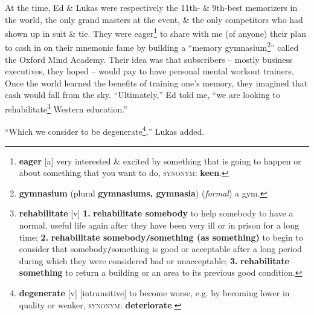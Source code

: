 \documentclass[oneside]{book}
\numberwithin{equation}{section}
\begin{document}
At the time, Ed \& Lukas were respectively the 11th- \& 9th-best memorizers in the world, the only grand masters at the event, \& the only competitors who had shown up in suit \& tie. They were eager\footnote{\textbf{eager} [a] very interested \& excited by something that is going to happen or about something that you want to do, \textsc{synonym}: \textbf{keen}.} to share with me (of anyone) their plan to cash in on their mnemonic fame by building a ``memory gymnasium\footnote{\textbf{gymnasium} (plural \textbf{gymnasiums, gymnasia}) (\textit{formal}) a gym.}'' called the Oxford Mind Academy. Their idea was that subscribers -- mostly business executives, they hoped -- would pay to have personal mental workout trainers. Once the world learned the benefits of training one's memory, they imagined that cash would fall from the sky. ``Ultimately,'' Ed told me, ``we are looking to rehabilitate\footnote{\textbf{rehabilitate} [v] \textbf{1.} \textbf{rehabilitate somebody} to help somebody to have a normal, useful life again after they have been very ill or in prison for a long time; \textbf{2.} \textbf{rehabilitate somebody\texttt{/}something (as something)} to begin to consider that somebody\texttt{/}something is good or acceptable after a long period during which they were considered bad or unacceptable; \textbf{3.} \textbf{rehabilitate something} to return a building or an area to its previous good condition.} Western education.''

``Which we consider to be degenerate\footnote{\textbf{degenerate} [v] [intransitive] to become worse, e.g. by becoming lower in quality or weaker, \textsc{synonym}: \textbf{deteriorate}.},'' Lukas added.
\end{document}
